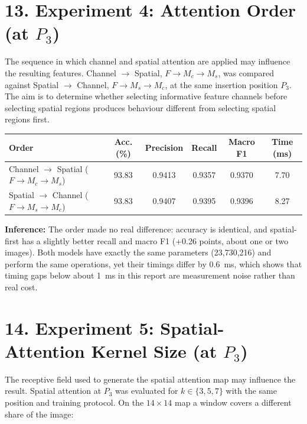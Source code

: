 \documentclass[11pt]{article}
\begin{document}
\section*{13. Experiment 4: Attention Order (at $P_3$)}

The sequence in which channel and spatial attention are applied may
influence the resulting features. Channel $\rightarrow$ Spatial,
$F\rightarrow M_c\rightarrow M_s$, was compared against Spatial
$\rightarrow$ Channel, $F\rightarrow M_s\rightarrow M_c$, at the same
insertion position $P_3$. The aim is to determine whether selecting
informative feature channels before selecting spatial regions produces
behaviour different from selecting spatial regions first.

\begin{center}
\small
\begin{tabular}{|l|c|c|c|c|c|}
\hline
Order & Acc. (\%) & Precision & Recall & Macro F1 & Time (ms)\\
\hline
Channel $\rightarrow$ Spatial ($F\rightarrow M_c\rightarrow M_s$) & 93.83 & 0.9413 & 0.9357 & 0.9370 & 7.70\\
Spatial $\rightarrow$ Channel ($F\rightarrow M_s\rightarrow M_c$) & 93.83 & 0.9407 & 0.9395 & 0.9396 & 8.27\\
\hline
\end{tabular}
\end{center}

\textbf{Inference:} The order made no real difference: accuracy is
identical, and spatial-first has a slightly better recall and macro F1
(+0.26 points, about one or two images). Both models have exactly the same
parameters (23{,}730{,}216) and perform the same operations, yet their
timings differ by 0.6~ms, which shows that timing gaps below about 1~ms in
this report are measurement noise rather than real cost.

\section*{14. Experiment 5: Spatial-Attention Kernel Size (at $P_3$)}

The receptive field used to generate the spatial attention map may
influence the result. Spatial attention at $P_3$ was evaluated for
$k\in\{3,5,7\}$ with the same position and training protocol. On the
$14\times14$ map a window covers a different share of the image:
\end{document}
